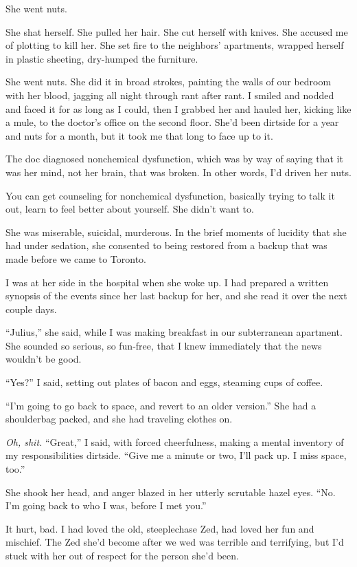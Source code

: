 She went nuts.

She shat herself. She pulled her hair. She cut herself with knives.
She accused me of plotting to kill her. She set fire to the
neighbors' apartments, wrapped herself in plastic sheeting,
dry-humped the furniture.

She went nuts. She did it in broad strokes, painting the walls of
our bedroom with her blood, jagging all night through rant after
rant. I smiled and nodded and faced it for as long as I could, then
I grabbed her and hauled her, kicking like a mule, to the doctor's
office on the second floor. She'd been dirtside for a year and nuts
for a month, but it took me that long to face up to it.

The doc diagnosed nonchemical dysfunction, which was by way of
saying that it was her mind, not her brain, that was broken. In
other words, I'd driven her nuts.

You can get counseling for nonchemical dysfunction, basically
trying to talk it out, learn to feel better about yourself. She
didn't want to.

She was miserable, suicidal, murderous. In the brief moments of
lucidity that she had under sedation, she consented to being
restored from a backup that was made before we came to Toronto.

I was at her side in the hospital when she woke up. I had prepared
a written synopsis of the events since her last backup for her, and
she read it over the next couple days.

“Julius,” she said, while I was making breakfast in our
subterranean apartment. She sounded so serious, so fun-free, that I
knew immediately that the news wouldn't be good.

“Yes?” I said, setting out plates of bacon and eggs, steaming cups
of coffee.

“I'm going to go back to space, and revert to an older version.”
She had a shoulderbag packed, and she had traveling clothes on.

\emph{Oh, shit.} “Great,” I said, with forced cheerfulness, making
a mental inventory of my responsibilities dirtside. “Give me a
minute or two, I'll pack up. I miss space, too.”

She shook her head, and anger blazed in her utterly scrutable hazel
eyes. “No. I'm going back to who I was, before I met you.”

It hurt, bad. I had loved the old, steeplechase Zed, had loved her
fun and mischief. The Zed she'd become after we wed was terrible
and terrifying, but I'd stuck with her out of respect for the
person she'd been.

